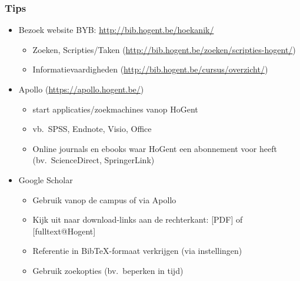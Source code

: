 \documentclass{beamer}
\begin{document}
\begin{frame}
  \frametitle{Tips}

  \begin{itemize}
    \item<+-> Bezoek website BYB: \url{http://bib.hogent.be/hoekanik/}
      \begin{itemize}
        \item Zoeken, Scripties/Taken (\url{http://bib.hogent.be/zoeken/scripties-hogent/})
        \item Informatievaardigheden (\url{http://bib.hogent.be/cursus/overzicht/})
      \end{itemize}
    \item<+-> Apollo (\url{https://apollo.hogent.be/})
      \begin{itemize}
        \item start applicaties/zoekmachines vanop HoGent
        \item vb.~SPSS, Endnote, Visio, Office
        \item Online journals en ebooks waar HoGent een abonnement voor heeft (bv.~ScienceDirect, SpringerLink)
      \end{itemize}
    \item<+-> Google Scholar
      \begin{itemize}
        \item Gebruik vanop de campus of via Apollo
        \item Kijk uit naar download-links aan de rechterkant: [PDF] of [fulltext@Hogent]
        \item Referentie in Bib{\TeX}-formaat verkrijgen (via instellingen)
        \item Gebruik zoekopties (bv.~beperken in tijd)
      \end{itemize}
  \end{itemize}
\end{frame}
\end{document}
